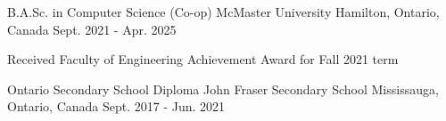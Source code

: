 

\begin{cventries}

  \cventry
    {B.A.Sc. in Computer Science (Co-op)} %
    {McMaster University} %
    {Hamilton, Ontario, Canada} %
    {Sept. 2021 - Apr. 2025} %
    {
    \begin{cvitems}
      \item {Received Faculty of Engineering Achievement Award for Fall 2021 term}
    \end{cvitems}
    }

  \cventry
    {Ontario Secondary School Diploma} %
    {John Fraser Secondary School} %
    {Mississauga, Ontario, Canada} %
    {Sept. 2017 - Jun. 2021} %
    {
    }

\end{cventries}
